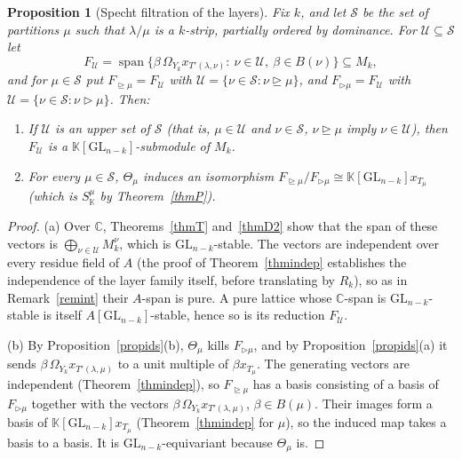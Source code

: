 \documentclass[11pt, letterpaper]{amsart}
\newtheorem{proposition}{Proposition}
\theoremstyle{definition}
\theoremstyle{remark}
\newcommand{\KK}{\mathbb{K}}
\newcommand{\CC}{\mathbb{C}}
\newcommand{\GL}{\mathrm{GL}}
\begin{document}
\begin{proposition}[Specht filtration of the layers]\label{propfilt}
Fix $k$, and let $\mathcal S$ be the set of partitions $\mu$ such that $\lambda/\mu$ is a $k$-strip, partially ordered by dominance. For $\mathcal U\subseteq\mathcal S$ let
\[
F_{\mathcal U}=\operatorname{span}\{\beta\,\Omega_{Y_k}x_{T'(\lambda,\nu)}:\ \nu\in\mathcal U,\ \beta\in B(\nu)\}\subseteq M_k,
\]
and for $\mu\in\mathcal S$ put $F_{\trianglerighteq\mu}=F_{\mathcal U}$ with $\mathcal U=\{\nu\in\mathcal S:\nu\trianglerighteq\mu\}$, and $F_{\triangleright\mu}=F_{\mathcal U}$ with $\mathcal U=\{\nu\in\mathcal S:\nu\triangleright\mu\}$. Then:
\begin{enumerate}
\item[(a)] If $\mathcal U$ is an upper set of $\mathcal S$ (that is, $\mu\in\mathcal U$ and $\nu\in\mathcal S$, $\nu\trianglerighteq\mu$ imply $\nu\in\mathcal U$), then $F_{\mathcal U}$ is a $\KK[\GL_{n-k}]$-submodule of $M_k$.
\item[(b)] For every $\mu\in\mathcal S$, $\Theta_\mu$ induces an isomorphism $F_{\trianglerighteq\mu}/F_{\triangleright\mu}\cong\KK[\GL_{n-k}]x_{T_\mu}$ (which is $S^\mu_\KK$ by Theorem~\ref{thmP}).
\end{enumerate}
\end{proposition}
\begin{proof}
(a) Over $\CC$, Theorems~\ref{thmT} and~\ref{thmD2} show that the span of these vectors is $\bigoplus_{\nu\in\mathcal U}M_k^\nu$, which is $\GL_{n-k}$-stable. The vectors are independent over every residue field of $A$ (the proof of Theorem~\ref{thmindep} establishes the independence of the layer family itself, before translating by $R_k$), so as in Remark~\ref{remint} their $A$-span is pure. A pure lattice whose $\CC$-span is $\GL_{n-k}$-stable is itself $A[\GL_{n-k}]$-stable, hence so is its reduction $F_{\mathcal U}$.

(b) By Proposition~\ref{propids}(b), $\Theta_\mu$ kills $F_{\triangleright\mu}$, and by Proposition~\ref{propids}(a) it sends $\beta\,\Omega_{Y_k}x_{T'(\lambda,\mu)}$ to a unit multiple of $\beta x_{T_\mu}$. The generating vectors are independent (Theorem~\ref{thmindep}), so $F_{\trianglerighteq\mu}$ has a basis consisting of a basis of $F_{\triangleright\mu}$ together with the vectors $\beta\,\Omega_{Y_k}x_{T'(\lambda,\mu)}$, $\beta\in B(\mu)$. Their images form a basis of $\KK[\GL_{n-k}]x_{T_\mu}$ (Theorem~\ref{thmindep} for $\mu$), so the induced map takes a basis to a basis. It is $\GL_{n-k}$-equivariant because $\Theta_\mu$ is.
\end{proof}
\end{document}

